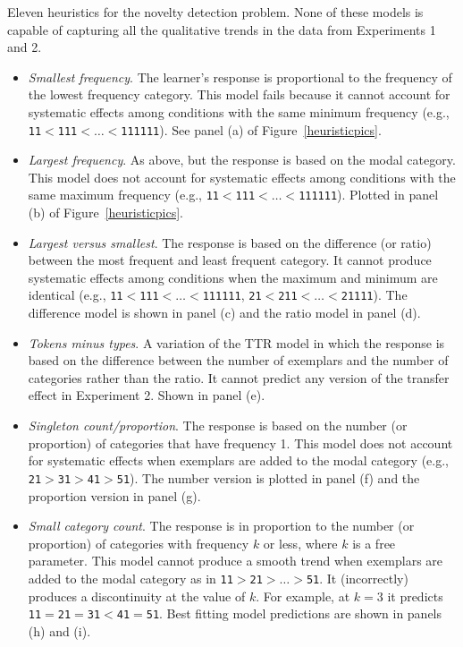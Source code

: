 \documentclass[doc]{apa6}
\newcommand{\dist}[1]{\texttt{#1}}
\begin{document}
\begin{table}[p]
\caption{Eleven heuristics for the novelty detection problem. None of these models is capable of capturing all the qualitative trends in the data from Experiments 1 and 2.}
\label{heuristicsfail}
\small
\begin{itemize}
\item {\it Smallest frequency}. The learner's response is proportional to the frequency of the lowest frequency category. This model fails because it cannot account for systematic effects among conditions with the same minimum frequency (e.g., \dist{11}$<$\dist{111}$<\ldots<$\dist{111111}). See panel (a) of Figure~\protect\ref{heuristicpics}.
\item {\it Largest frequency}. As above, but the response is based on the modal category. This model does not account for systematic effects among conditions with the same maximum frequency (e.g., \dist{11}$<$\dist{111}$<\ldots<$\dist{111111}). Plotted in panel (b) of Figure~\protect\ref{heuristicpics}.
\item {\it Largest versus smallest}. The response is based on the difference (or ratio) between the most frequent and least frequent category. It cannot produce systematic effects among conditions when the maximum and minimum are identical (e.g., \dist{11}$<$\dist{111}$<\ldots<$\dist{111111}, \dist{21}$<$\dist{211}$<\ldots<$\dist{21111}). The difference model is shown in panel (c) and the ratio model in panel (d).
\item {\it Tokens minus types}. A variation of the TTR model in which the response is based on the difference between the number of exemplars and the number of categories rather than the ratio. It cannot predict any version of the transfer effect in Experiment 2. Shown in panel (e).
\item {\it Singleton count/proportion}. The response is based on the number (or proportion) of categories that have frequency 1. This model does not account for systematic effects when exemplars are added to the modal category (e.g., \dist{21}$>$\dist{31}$>$\dist{41}$>$\dist{51}). The number version is plotted in panel (f) and the proportion version in panel (g).
\item {\it Small category count}. The response is in proportion to the number (or proportion) of categories with frequency $k$ or less, where $k$ is a free parameter. This model cannot produce a smooth trend when exemplars are added to the modal category  as in \dist{11}$>$\dist{21}$>\ldots>$\dist{51}. It (incorrectly) produces a discontinuity at the value of $k$. For example, at $k=3$ it predicts \dist{11}$=$\dist{21}$=$\dist{31}$<$\dist{41}$=$\dist{51}. Best fitting model predictions are shown in panels (h) and (i).

\end{itemize}
\end{table}
\end{document}
